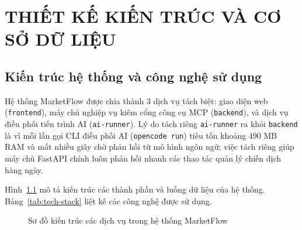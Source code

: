\chapter{THIẾT KẾ KIẾN TRÚC VÀ CƠ SỞ DỮ LIỆU}

\section{Kiến trúc hệ thống và công nghệ sử dụng}

Hệ thống MarketFlow được chia thành 3 dịch vụ tách biệt: giao diện web (\texttt{frontend}), máy chủ nghiệp vụ kiêm cổng công cụ MCP (\texttt{backend}), và dịch vụ điều phối tiến trình AI (\texttt{ai-runner}). Lý do tách riêng \texttt{ai-runner} ra khỏi \texttt{backend} là vì mỗi lần gọi CLI điều phối AI (\texttt{opencode run}) tiêu tốn khoảng 490 MB RAM và mất nhiều giây chờ phản hồi từ mô hình ngôn ngữ; việc tách riêng giúp máy chủ FastAPI chính luôn phản hồi nhanh các thao tác quản lý chiến dịch hàng ngày.

Hình~\ref{fig:container} mô tả kiến trúc các thành phần và luồng dữ liệu của hệ thống. Bảng~\ref{tab:tech-stack} liệt kê các công nghệ được sử dụng.

\begin{figure}[!htbp]
\centering

\caption{Sơ đồ kiến trúc các dịch vụ trong hệ thống MarketFlow}
\label{fig:container}
\end{figure}

